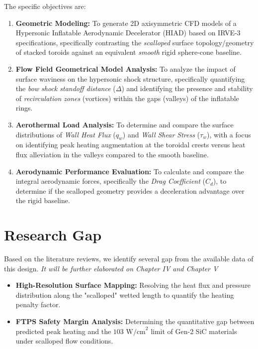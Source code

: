 The specific objectives are:
\begin{enumerate}
    \item \textbf{Geometric Modeling:} To generate 2D axisymmetric CFD models of a Hypersonic Inflatable Aerodynamic Decelerator (HIAD) based on IRVE-3 specifications, specifically contrasting the \textit{scalloped} surface topology/geometry of stacked toroids against an equivalent \textit{smooth} rigid sphere-cone baseline.

    \item \textbf{Flow Field Geometrical Model Analysis:} To analyze the impact of surface waviness on the hypersonic shock structure, specifically quantifying the \textit{bow shock standoff distance} ($\Delta$) and identifying the presence and stability of \textit{recirculation zones} (vortices) within the gaps (valleys) of the inflatable rings.

    \item \textbf{Aerothermal Load Analysis:} To determine and compare the surface distributions of \textit{Wall Heat Flux} ($q_w$) and \textit{Wall Shear Stress} ($\tau_w$), with a focus on identifying peak heating augmentation at the toroidal crests versus heat flux alleviation in the valleys compared to the smooth baseline.

    \item \textbf{Aerodynamic Performance Evaluation:} To calculate and compare the integral aerodynamic forces, specifically the \textit{Drag Coefficient} ($C_d$), to determine if the scalloped geometry provides a deceleration advantage over the rigid baseline.
\end{enumerate}

\section{Research Gap}
Based on the literature reviews, we identify several gap from the available data of this design.
\textit{It will be further elaborated on Chapter IV and Chapter V}
\begin{itemize}
    \item \textbf{High-Resolution Surface Mapping:} Resolving the heat flux and pressure distribution along the "scalloped" wetted length to quantify the heating penalty factor.
    \item \textbf{FTPS Safety Margin Analysis:} Determining the quantitative gap between predicted peak heating and the $103 \text{ W/cm}^2$ limit of Gen-2 SiC materials under scalloped flow conditions.
\end{itemize}

